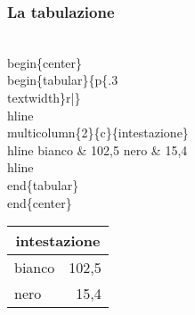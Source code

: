 \begin{frame}
  \frametitle{La tabulazione}
	\begin{LaTeXcode}
		\alert{\\begin\{center\}}\n
		\\begin\{tabular\}\{p\{.3\\textwidth\}r|\}\
		\\hline \n
		\\multicolumn\{2\}\{c\}\{intestazione\}\bs\bs \
		\\hline \n
		\hspace*{5ex}bianco \& 102,5 \bs\bs\n
		\hspace*{5ex}nero   \& 15,4 \bs\bs\
		\\hline\n
		\\end\{tabular\}\n
		\alert{\\end\{center\}}
	\end{LaTeXcode}
	\begin{LaTeXoutput}
	  \begin{center}
		\begin{tabular}{p{}r}\hline
		\multicolumn{2}{c}{intestazione}\\\hline
		bianco & 102,5 \\
		nero   & 15,4 \\\hline
		\end{tabular}
	  \end{center}
	\end{LaTeXoutput}
\end{frame}

